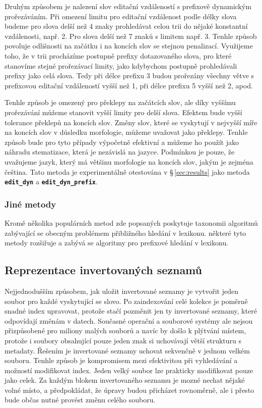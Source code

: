\documentclass[11pt,letterpaper,oneside,openright]{book}
\newcommand{\bftt}[1]{\texttt{\textbf{#1}}}
\begin{document}
Druhým způsobem je nalezení slov editační vzdáleností s prefixově dynamickým
prořezáváním. Při omezení limitu pro editační vzdálenost podle délky slova
budeme pro slova delší než 4 znaky prohledávat celou trii do nějaké konstantní
vzdálenosti, např. 2. Pro slova delší než 7 znaků s limitem např. 3. Tenhle
způsob povoluje odlišnosti na začátku i na koncích slov se stejnou penalizací.
Využijeme toho, že v trii procházíme postupně prefixy dotazovaného slova, pro
které stanovíme stejné prořezávací limity, jako kdybychom postupně prohledávali
prefixy jako celá slova. Tedy při délce prefixu 3 budou prořezány všechny větve
s prefixovou editační vzdáleností vyšší než 1, při délce prefixu 5 vyšší než 2,
apod.

Tenhle způsob je omezený pro překlepy na začátcích slov, ale díky vyššímu
prořezávání můžeme stanovit vyšší limity pro delší slova. Efektem bude vyšší
tolerance překlepů na koncích slov. Změny slov, které se vyskytují v nejvyšší
míře na koncích slov v důsledku morfologie, můžeme uvažovat jako překlepy.
Tenhle způsob bude pro tyto případy výpočetně efektivní a můžeme ho použít jako
náhradu stematizace, která je nezávislá na jazyce. Podmínkou je pouze, že
uvažujeme jazyk, který má většinu morfologie na koncích slov, jakým je zejména
čeština. Tato metoda je experimentálně otestována v \S\,\ref{sec:results} jako
metoda \bftt{edit\_dyn} a \bftt{edit\_dyn\_prefix}.



\subsubsection{Jiné metody}
Kromě několika populárních metod zde popsaných poskytuje
\cite{Boytsov:2011:IMA:1963190.1963191} taxonomii algoritmů zabývající se
obecným problémem přibližného hledání v lexikonu.
\cite{Bast:2013:EFS:2457465.2457470} některé tyto metody rozšiřuje a zabývá se
algoritmy pro prefixové hledání v lexikonu.



\subsection{Reprezentace invertovaných seznamů}
Nejjednodušším způsobem, jak uložit invertované seznamy je vytvořit jeden
soubor pro každé vyskytující se slovo. Po zaindexování celé kolekce je poměrně
snadné index upravovat, protože stačí pozměnit jen ty invertované seznamy,
které odpovídají změnám v datech. Současné operační a souborové systémy ale
nejsou přizpůsobené pro miliony malých souborů a navíc by došlo k plýtvání
místem, protože i soubory obsahující pouze jeden znak si uchovávají větší
strukturu s metadaty. Řešením je invertované seznamy uchovat sekvenčně v jednom
velkém souboru. Tenhle způsob je kompromisem mezi efektivitou při vyhledávání a
možností modifikovat index. Jeden velký soubor lze prakticky modifikovat pouze
jako celek. Za každým blokem invertovaného seznamu je mozné nechat nějaké volné
místo, a předpokládat, že úpravy budou přicházet rovnoměrně, ale i přesto bude
občas nutné provést změnu celého souboru.
\end{document}
